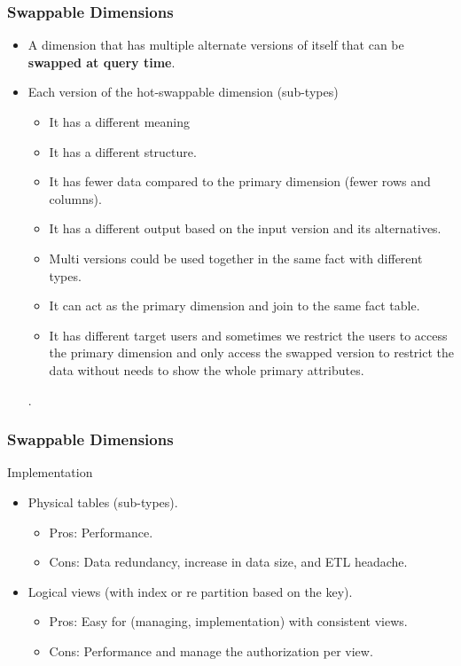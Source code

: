 \VideoClassification[column=1, colour=blue]
\begin{frame}
\frametitle{Swappable Dimensions}
	\begin{itemize}[<+->]
		\item A dimension that has multiple alternate versions of itself that can be \textbf{swapped at query time}.
		\item Each version of the hot-swappable dimension (sub-types)
			\begin{itemize}[<+->]
				\item It has a different meaning
				\item It has a different structure.
				\item It has fewer data compared to the primary dimension (fewer rows and columns).
				\item It has a different output based on the input version and its alternatives.
				\item Multi versions could be used together in the same fact with different types.
				\item It can act as the primary dimension and join to the same fact table.
				\item It has different target users and sometimes we restrict the users to access the primary dimension and only access the swapped version to restrict the data without needs to show the whole primary attributes.

			\end{itemize}.
	\end{itemize}
	
\end{frame}
\begin{frame}
\frametitle{Swappable Dimensions}
\centering

\begin{block}{Implementation}
	\begin{itemize}
		\item Physical tables (sub-types).
		\begin{itemize}
			\item Pros: Performance.
			\item Cons: Data redundancy, increase in data size, and ETL headache.
		\end{itemize}
		\item Logical views (with index or re partition based on the key).%
		\begin{itemize}
			\item Pros: Easy for (managing, implementation) with consistent views.
			\item Cons: Performance and manage the authorization per view.
		\end{itemize}		
	\end{itemize}
\end{block}
\end{frame}
